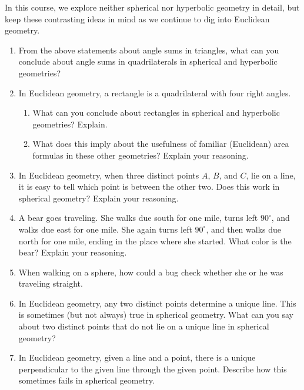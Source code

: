 

In this course, we explore neither spherical nor hyperbolic geometry in detail, but keep these contrasting ideas in mind as we continue to dig into Euclidean geometry.  

\begin{problems}

\begin{enumerate}

\item From the above statements about angle sums in triangles, what can you conclude about angle sums in quadrilaterals  in spherical and hyperbolic geometries?

\item In Euclidean geometry, a rectangle is a quadrilateral with four right angles. 
\begin{enumerate}
\item What can you conclude about rectangles in spherical and hyperbolic geometries?  Explain.  
\item What does this imply about the usefulness of familiar (Euclidean) area formulas in these other geometries?  Explain your reasoning. 
\end{enumerate} 

\item In Euclidean geometry, when three distinct points $A$, $B$, and $C$, lie on a line, it is easy to tell which point is between the other two.  Does this work in spherical geometry?  Explain your reasoning.  

\item A bear goes traveling.  She walks due south for one mile, turns left $90^\circ$, and walks due east for one mile.  She again turns left $90^\circ$, and then walks due north for one mile, ending in the place where she started.  What color is the bear?  Explain your reasoning.  

\item When walking on a sphere, how could a bug check whether she or he was traveling straight.  

\item In Euclidean geometry, any two distinct points determine a unique line.  This is sometimes (but not always) true in spherical geometry.  What can you say about two distinct points that do not lie on a unique line in spherical geometry?  

\item In Euclidean geometry, given a line and a point, there is a unique perpendicular to the given line through the given point.  Describe how this sometimes fails in spherical geometry.  


\end{enumerate}
\end{problems}
